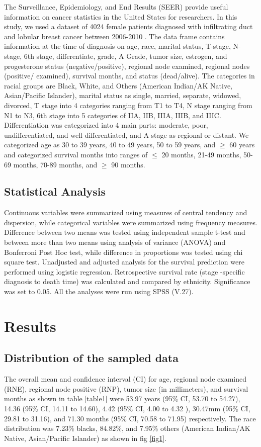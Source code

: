 \documentclass[times,sort&compress,3p]{elsarticle}
\theoremstyle{plain}
\theoremstyle{definition}
\begin{document}
The Surveillance, Epidemiology, and End Results (SEER) provide useful information on cancer statistics in the United States for researchers. In this study, we used a dataset of 4024 female patients diagnosed with infiltrating duct and lobular breast cancer between 2006-2010 \cite{teng2019seer}. The data frame contains information at the time of diagnosis on age, race, marital status, T-stage, N-stage, 6th stage, differentiate, grade, A Grade, tumor size, estrogen, and progesterone status (negative{/}positive), regional node examined, regional nodes (positive{/} examined), survival months, and status (dead{/}alive). The categories in racial groups are Black, White, and Others (American Indian{/}AK Native, Asian{/}Pacific Islander), marital status as single, married, separate, widowed, divorced, T stage into 4 categories ranging from T1 to T4, N stage ranging from N1 to N3, 6th stage into 5 categories of IIA, IIB, IIIA, IIIB, and IIIC. Differentiation was categorized into 4 main parts: moderate, poor, undifferentiated, and well differentiated, and A stage as regional or distant. We categorized age as 30 to 39 years, 40 to 49 years, 50 to 59 years, and $\geq$ 60 years and categorized survival months into ranges of $\leq$ 20 months, 21-49 months, 50-69 months, 70-89 months, and $\geq$ 90 months.

\subsection{Statistical Analysis}
Continuous variables were summarized using measures of central tendency and dispersion, while categorical variables were summarized using frequency measures. Difference between two means was tested using independent sample t-test and between more than two means using analysis of variance (ANOVA) and Bonferroni Post Hoc test, while difference in proportions was tested using chi square test. Unadjusted and adjusted analysis for the survival prediction were performed using logistic regression. Retrospective survival rate (stage -specific diagnosis to death time) was calculated and compared by ethnicity. Significance was set to 0.05. All the analyses were run using SPSS (V.27).

\section{Results\label{sec:3}}
\subsection{Distribution of the sampled data}
The overall mean and confidence interval (CI) for age, regional node examined (RNE), regional node positive (RNP), tumor size (in millimeters), and survival months as shown in table \ref{table1} were 53.97 years (95\% CI, 53.70 to 54.27), 14.36 (95\% CI, 14.11 to 14.60), 4.42 (95\% CI, 4.00 to 4.32 ), 30.47mm (95\% CI, 29.81 to 31.16), and 71.30 months (95\% CI, 70.58 to 71.95) respectively. The race distribution was 7.23\% blacks, 84.82\%, and 7.95\% others (American Indian/AK Native, Asian/Pacific Islander) as shown in fig \ref{fig1}.
\end{document}
